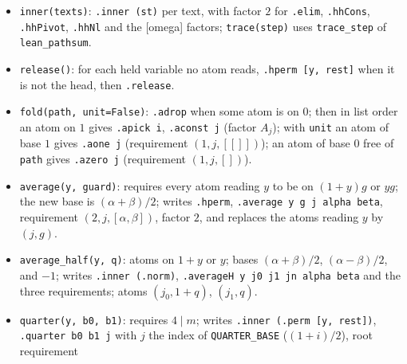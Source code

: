 \begin{itemize}
\item \textnormal{\texttt{inner(\allowbreak{}texts)}}: \textnormal{\texttt{.\allowbreak{}inner (\allowbreak{}st)}} per text, with factor $2$ for \textnormal{\texttt{.\allowbreak{}elim}},
  \textnormal{\texttt{.\allowbreak{}hhCons}}, \textnormal{\texttt{.\allowbreak{}hhPivot}}, \textnormal{\texttt{.\allowbreak{}hhNl}} and the [omega] factors; \textnormal{\texttt{trace(\allowbreak{}step)}} uses
  \textnormal{\texttt{trace\_\allowbreak{}step}} of \textnormal{\texttt{lean\_\allowbreak{}pathsum}}.
\item \textnormal{\texttt{release(\allowbreak{})}}: for each held variable no atom reads, \textnormal{\texttt{.\allowbreak{}hperm [y,\allowbreak{} rest]}} when it is not
  the head, then \textnormal{\texttt{.\allowbreak{}release}}.
\item \textnormal{\texttt{fold(\allowbreak{}path,\allowbreak{} unit=False)}}: \textnormal{\texttt{.\allowbreak{}adrop}} when some atom is on $0$; then in list order an atom
  on $1$ gives \textnormal{\texttt{.\allowbreak{}apick i}}, \textnormal{\texttt{.\allowbreak{}aconst j}} (factor $A_j$); with \textnormal{\texttt{unit}} an atom of base $1$
  gives \textnormal{\texttt{.\allowbreak{}aone j}} (requirement $(1,j,[[]])$); an atom of base $0$ free of \textnormal{\texttt{path}} gives
  \textnormal{\texttt{.\allowbreak{}azero j}} (requirement $(1,j,[])$).
\item \textnormal{\texttt{average(\allowbreak{}y,\allowbreak{} guard)}}: requires every atom reading $y$ to be on $(1+y)g$ or $yg$; the new base
  is $(\alpha+\beta)/2$; writes \textnormal{\texttt{.\allowbreak{}hperm}}, \textnormal{\texttt{.\allowbreak{}average y g j alpha beta}}, requirement
  $(2,j,[\alpha,\beta])$, factor $2$, and replaces the atoms reading $y$ by $(j,g)$.
\item \textnormal{\texttt{average\_\allowbreak{}half(\allowbreak{}y,\allowbreak{} q)}}: atoms on $1+y$ or $y$; bases $(\alpha+\beta)/2$, $(\alpha-\beta)/2$, and
  $-1$; writes \textnormal{\texttt{.\allowbreak{}inner (\allowbreak{}.\allowbreak{}norm)}}, \textnormal{\texttt{.\allowbreak{}averageH y j0 j1 jn alpha beta}} and the three
  requirements; atoms $(j_0, 1+q)$, $(j_1, q)$.
\item \textnormal{\texttt{quarter(\allowbreak{}y,\allowbreak{} b0,\allowbreak{} b1)}}: requires $4\mid m$; writes \textnormal{\texttt{.\allowbreak{}inner (\allowbreak{}.\allowbreak{}perm [y,\allowbreak{} rest])}},
  \textnormal{\texttt{.\allowbreak{}quarter b0 b1 j}} with $j$ the index of \textnormal{\texttt{QUARTER\_\allowbreak{}BASE}} ($(1+i)/2$), root requirement

\end{itemize}
